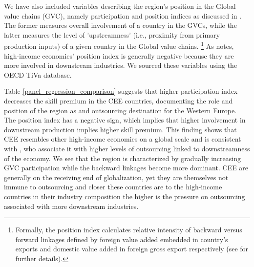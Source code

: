 \documentclass[11pt]{article}
\begin{document}
We have also included variables describing the region's position in the Global value chains (GVC), namely participation and position indices as discussed in \citet{coveri2024global}. The former measures overall involvement of a country in the GVCs, while the latter measures the level of 'upstreamness' (i.e., proximity from primary production inputs) of a given country in the Global value chains. \footnote{Formally, the position index calculates relative intensity of backward versus forward linkages defined by foreign value added embedded in country's exports and domestic value added in foreign gross export respectively (see \cite{coveri2024global} for further details).} As \cite{coveri2024global} notes, high-income economies' position index is generally negative because they are more involved in downstream industries. We sourced these variables using the OECD TiVa database.

Table \ref{panel_regression_comparison} suggests that higher participation index decreases the skill premium in the CEE countries, documenting the role and position of the region as and outsourcing destination for the Western Europe. The position index has a negative sign, which implies that higher involvement in downstream production implies higher skill premium. This finding shows that CEE resembles other high-income economies on a global scale and is consistent with \citet{coveri2024global}, who associate it with higher levels of outsourcing linked to downstreamness of the economy. We see that the region is characterized by gradually increasing GVC participation while the backward linkages become more dominant. CEE are generally on the receiving end of globalization, yet they are themselves not immune to outsourcing and closer these countries are to the high-income countries in their industry composition the higher is the pressure on outsourcing associated with more downstream industries.

\end{document}
